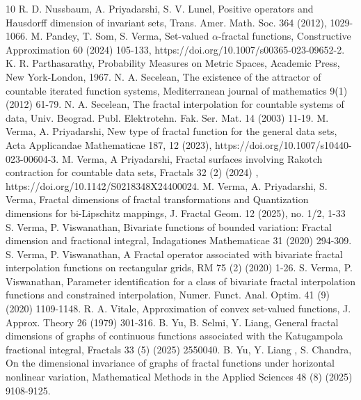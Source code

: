 \documentclass[12pt,oneside,reqno]{amsart}
\theoremstyle{definition}
\theoremstyle{remark}
\begin{document}
\begin{thebibliography}{10}
 R. D. Nussbaum, A. Priyadarshi, S. V. Lunel, Positive operators and Hausdorff dimension of invariant sets, Trans. Amer. Math. Soc. 364 (2012), 1029-1066.
 M. Pandey, T. Som, S. Verma, Set-valued $\alpha$-fractal functions, Constructive Approximation 60 (2024) 105-133, https://doi.org/10.1007/s00365-023-09652-2.
 K. R. Parthasarathy, Probability Measures on Metric Spaces, Academic Press, New York-London, 1967.
 N. A.  Secelean, The existence of the attractor of countable iterated function systems, Mediterranean journal of mathematics 9(1) (2012) 61-79.
 N. A. Secelean, The fractal interpolation for countable systems of data, Univ. Beograd. Publ. Elektrotehn. Fak. Ser. Mat. 14 (2003) 11-19.
 M. Verma, A. Priyadarshi, New type of fractal function for the general data sets, Acta Applicandae Mathematicae 187, 12 (2023), https://doi.org/10.1007/s10440-023-00604-3.
 M. Verma, A Priyadarshi, Fractal surfaces involving Rakotch contraction for countable data sets, Fractals 32 (2) (2024) , https://doi.org/10.1142/S0218348X24400024.
 M. Verma, A. Priyadarshi, S. Verma, Fractal dimensions of fractal transformations and Quantization dimensions for bi-Lipschitz mappings, J. Fractal Geom. 12 (2025), no. 1/2, 1-33
 S. Verma, P. Viswanathan, Bivariate functions of bounded variation: Fractal dimension and fractional integral, Indagationes Mathematicae 31 (2020) 294-309.
 S. Verma, P. Viswanathan, A Fractal operator associated with bivariate fractal interpolation functions on rectangular grids, RM 75 (2) (2020) 1-26.
 S. Verma, P. Viswanathan, Parameter identification for a class of bivariate fractal interpolation functions and constrained interpolation, Numer. Funct. Anal. Optim. 41 (9) (2020) 1109-1148.
 R. A. Vitale, Approximation of convex set-valued functions, J. Approx. Theory 26 (1979) 301-316.
 B. Yu, B. Selmi, Y. Liang, General fractal dimensions of graphs of continuous functions associated with the Katugampola fractional integral, Fractals 33 (5) (2025) 2550040.
 B. Yu, Y. Liang , S. Chandra, On the dimensional invariance of graphs of fractal functions under horizontal nonlinear variation, Mathematical Methods in the Applied Sciences 48 (8) (2025) 9108-9125.





\end{thebibliography}
\end{document}
